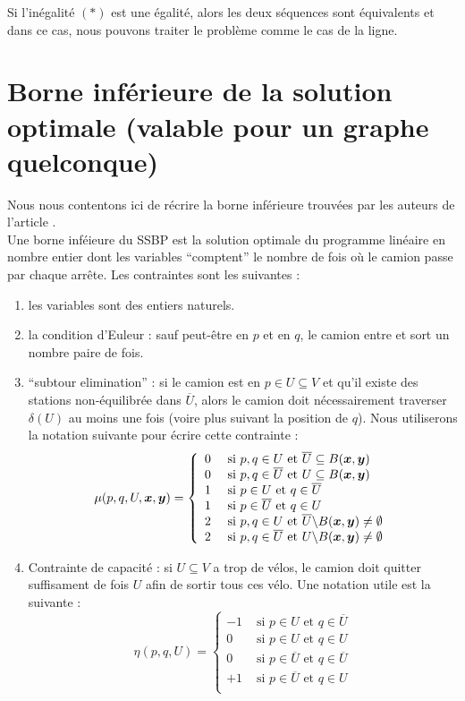 \documentclass[twoside,11pt,openany,a4paper]{rapport}
\begin{document}
Si l'inégalité $(*)$ est une égalité, alors les deux séquences sont équivalents et dans ce cas, nous pouvons traiter le problème comme le cas de la ligne.

\section{Borne inférieure de la solution optimale (valable pour un graphe quelconque)}
\label{Borne inf générale}

Nous nous contentons ici de récrire la borne inférieure trouvées par les auteurs de l'article \cite{Benchimol2011}.
\\

Une borne inféieure du SSBP est la solution optimale du programme linéaire en nombre entier dont les variables ``comptent'' le nombre de fois où le camion passe par chaque arrête. Les contraintes sont les suivantes :
\begin{enumerate}[label=(\roman*)]
\item les variables sont des entiers naturels.
\item la condition d'Euleur : sauf peut-être en $p$ et en $q$, le camion entre et sort un nombre paire de fois.
\item ``subtour elimination'' : si le camion est en $p \in U \subseteq V $ et qu'il existe des stations non-équilibrée dans $\overline{U}$, alors le camion doit nécessairement traverser $\delta(U)$ au moins une fois (voire plus suivant la position de $q$). Nous utiliserons la notation suivante pour écrire cette contrainte :
\[
\mu(p,q,U,\boldsymbol{x},\boldsymbol{y}) = \left\{
\begin{array}{ll}
  0 &\mbox{ si } p,q \in U            \mbox{ et } \overline{U} \subseteq B(\boldsymbol{x},\boldsymbol{y})\\
  0 &\mbox{ si } p,q \in \overline{U} \mbox{ et } U \subseteq B(\boldsymbol{x},\boldsymbol{y})\\
  1 &\mbox{ si } p \in U              \mbox{ et } q \in \overline{U}\\
  1 &\mbox{ si } p \in \overline{U}   \mbox{ et } q \in U\\
  2 &\mbox{ si } p,q \in U            \mbox{ et } \overline{U} \backslash B(\boldsymbol{x},\boldsymbol{y}) \ne \emptyset\\
  2 &\mbox{ si } p,q \in \overline{U} \mbox{ et } U \backslash B(\boldsymbol{x},\boldsymbol{y}) \ne \emptyset
\end{array}
\right.
\]
\item Contrainte de capacité : si $U \subseteq V$ a trop de vélos, le camion doit quitter suffisament de fois $U$ afin de sortir tous ces vélo. Une notation utile est la suivante :
\[
\eta(p,q,U) = \left\{
\begin{array}{ll}
  -1 &\mbox{ si } p \in U            \mbox{ et } q \in \overline{U}\\
  0  &\mbox{ si } p \in U            \mbox{ et } q \in U\\
  0  &\mbox{ si } p \in \overline{U} \mbox{ et } q \in \overline{U}\\
  +1 &\mbox{ si } p \in \overline{U} \mbox{ et } q \in U\\
\end{array}
\right.
\]
\end{enumerate}
\end{document}
